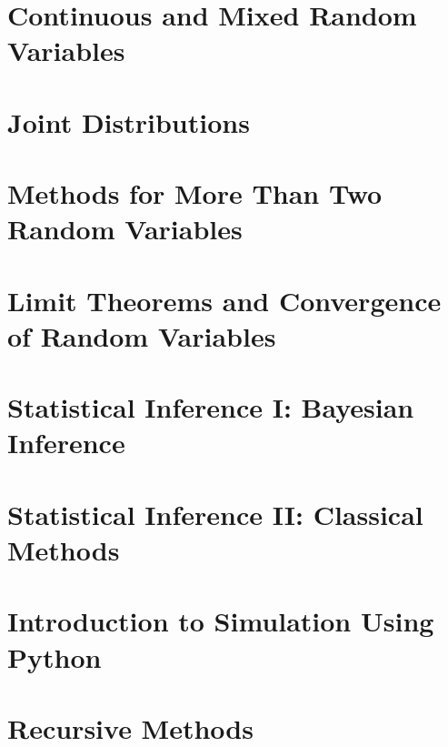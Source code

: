 \documentclass[11pt]{book}
\begin{document}
\chapter{Continuous and Mixed Random Variables}


\chapter{Joint Distributions}


\chapter{Methods for More Than Two Random Variables}


\chapter{Limit Theorems and Convergence of Random Variables}


\chapter{Statistical Inference I: Bayesian Inference}


\chapter{Statistical Inference II: Classical Methods}


\chapter{Introduction to Simulation Using Python}


\chapter{Recursive Methods}

\end{document}
